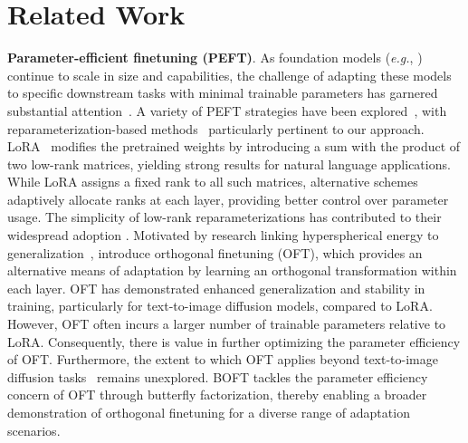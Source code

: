 \section{Related Work}

\textbf{Parameter-efficient finetuning (PEFT)}. As foundation models (\emph{e.g.}, \cite{brown2020language,radford2021learning,rombach2022high,kirillov2023segment}) continue to scale in size and capabilities, the challenge of adapting these models to specific downstream tasks with minimal trainable parameters has garnered substantial attention~\cite{treviso2023efficient,ding2023parameter,lialin2023scaling}. A variety of PEFT strategies have been explored~\cite{houlsby2019parameter,aghajanyan2020intrinsic,hulora2022,edalati2022krona,wang2022adamix,gheini2021cross,zaken2022bitfit,guo2020parameter,sung2021training,ansell2022composable,lester2021power,li2021prefix,vu2022spot,he2021towards,mao2021unipelt,karimi2021compacter,liu2022few,sung2022lst,chen2022parameter,jia2022visual,chen2022adaptformer,zhang2022neural,jie2023fact,lian2022scaling,luo2023towards}, with reparameterization-based methods~\cite{aghajanyan2020intrinsic,hulora2022,edalati2022krona} particularly pertinent to our approach. LoRA~\cite{hulora2022} modifies the pretrained weights by introducing a sum with the product of two low-rank matrices, yielding strong results for natural language applications. While LoRA assigns a fixed rank to all such matrices, alternative schemes~\cite{zhang2022adaptive,valipour2022dylora,zhang2023increlora} adaptively allocate ranks at each layer, providing better control over parameter usage. The simplicity of low-rank reparameterizations has contributed to their widespread adoption \cite{dettmers2023qlora,zi2023delta,chavan2023one}. Motivated by research linking hyperspherical energy to generalization~\cite{liu2018learning,liu2021orthogonal}, \cite{qiu2023controlling} introduce orthogonal finetuning (OFT), which provides an alternative means of adaptation by learning an orthogonal transformation within each layer. OFT has demonstrated enhanced generalization and stability in training, particularly for text-to-image diffusion models, compared to LoRA. However, OFT often incurs a larger number of trainable parameters relative to LoRA. Consequently, there is value in further optimizing the parameter efficiency of OFT. Furthermore, the extent to which OFT applies beyond text-to-image diffusion tasks~\cite{qiu2023controlling} remains unexplored. BOFT tackles the parameter efficiency concern of OFT through butterfly factorization, thereby enabling a broader demonstration of orthogonal finetuning for a diverse range of adaptation scenarios.

